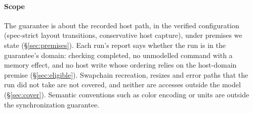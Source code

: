 \documentclass[acmtog,anonymous,review]{acmart}
\begin{document}
\paragraph{Scope}
The guarantee is about the recorded host path, in the verified configuration (spec-strict layout transitions,
conservative host capture), under premises we state (\S\ref{sec:premises}). Each run's report says whether the run is
in the guarantee's domain: checking completed, no unmodelled command with a memory effect, and no host write whose
ordering relies on the host-domain premise (\S\ref{sec:eligible}). Swapchain recreation, resizes and error paths that
the run did not take are not covered, and neither are accesses outside the model (\S\ref{sec:cover}).
Semantic conventions such as color encoding or units are outside the synchronization guarantee.
\end{document}

